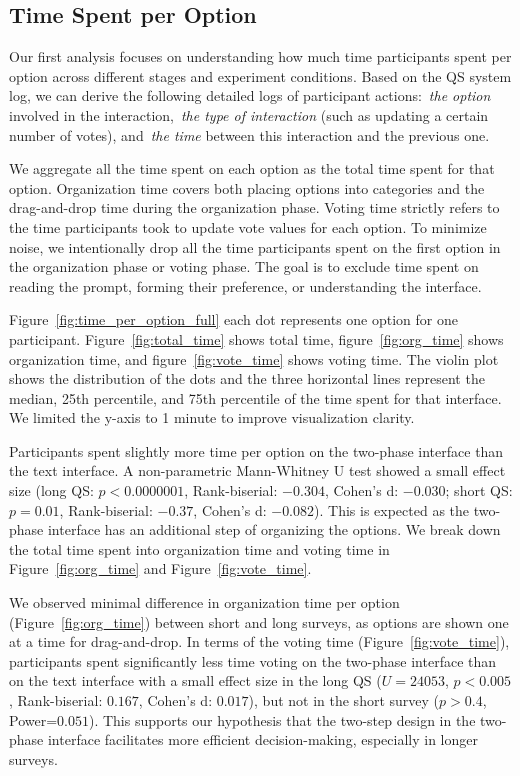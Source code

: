 \subsection{Time Spent per Option}
\label{sec:time_per_option}
Our first analysis focuses on understanding how much time participants spent per option across different stages and experiment conditions. Based on the QS system log, we can derive the following detailed logs of participant actions:~\textit{the option}  involved in the interaction,~\textit{the type of interaction} (such as updating a certain number of votes), and~\textit{the time} between this interaction and the previous one.

We aggregate all the time spent on each option as the total time spent for that option. Organization time covers both placing options into categories and the drag-and-drop time during the organization phase. Voting time strictly refers to the time participants took to update vote values for each option. To minimize noise, we intentionally drop all the time participants spent on the first option in the organization phase or voting phase. The goal is to exclude time spent on reading the prompt, forming their preference, or understanding the interface.

Figure~\ref{fig:time_per_option_full} each dot represents one option for one participant. Figure~\ref{fig:total_time} shows total time, figure~\ref{fig:org_time} shows organization time, and figure~\ref{fig:vote_time} shows voting time. The violin plot shows the distribution of the dots and the three horizontal lines represent the median, 25th percentile, and 75th percentile of the time spent for that interface. We limited the y-axis to 1 minute to improve visualization clarity.

Participants spent slightly more time per option on the two-phase interface than the text interface. A non-parametric Mann-Whitney U test showed a small effect size (long QS: $p<0.0000001$, Rank-biserial: $-0.304$, Cohen's d: $-0.030$; short QS: $p=0.01$, Rank-biserial: $-0.37$, Cohen's d: $-0.082$). This is expected as the two-phase interface has an additional step of organizing the options. We break down the total time spent into organization time and voting time in Figure~\ref{fig:org_time} and Figure~\ref{fig:vote_time}.

We observed minimal difference in organization time per option (Figure~\ref{fig:org_time}) between short and long surveys, as options are shown one at a time for drag-and-drop. In terms of the voting time (Figure~\ref{fig:vote_time}), participants spent significantly less time voting on the two-phase interface than on the text interface with a small effect size in the long QS ($U=24053$, $p<0.005$, Rank-biserial: $0.167$, Cohen's d: $0.017$), but not in the short survey ($p>0.4$, Power=$0.051$). This supports our hypothesis that the two-step design in the two-phase interface facilitates more efficient decision-making, especially in longer surveys.



